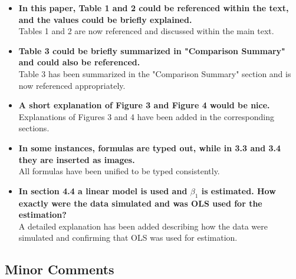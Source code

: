 \documentclass[aodsor,preprint]{imsart}
\numberwithin{equation}{section}
\theoremstyle{plain}
\begin{document}
\begin{itemize}
    \item \textbf{In this paper, Table 1 and 2 could be referenced within the text, and the values could be briefly explained.}\\
    Tables 1 and 2 are now referenced and discussed within the main text.
    
    \item \textbf{Table 3 could be briefly summarized in "Comparison Summary" and could also be referenced.}\\
    Table 3 has been summarized in the "Comparison Summary" section and is now referenced appropriately.
    
    \item \textbf{A short explanation of Figure 3 and Figure 4 would be nice.}\\
    Explanations of Figures 3 and 4 have been added in the corresponding sections.
    
    \item \textbf{In some instances, formulas are typed out, while in 3.3 and 3.4 they are inserted as images.}\\
    All formulas have been unified to be typed consistently.
    
    \item \textbf{In section 4.4 a linear model is used and $\beta_1$ is estimated. How exactly were the data simulated and was OLS used for the estimation?}\\
    A detailed explanation has been added describing how the data were simulated and confirming that OLS was used for estimation.
\end{itemize}

\subsection*{Minor Comments}
\end{document}
